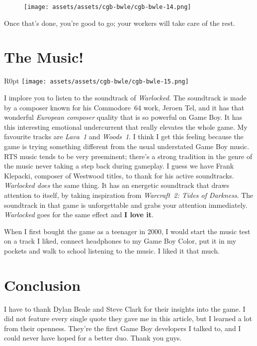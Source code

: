\documentclass{book}
\begin{document}
\begin{figure}[hbt]
\vskip 10pt
\centering \texttt{[image: assets/assets/cgb-bwle/cgb-bwle-14.png]}
\vskip 6pt
\end{figure}

Once that’s done, you’re good to go; your workers will take care of the rest.

\FloatBarrier\needspace{10mm}\section*{The Music!}\nopagebreak[4]

\begin{wrapfigure}{R}{0pt} \texttt{[image: assets/assets/cgb-bwle/cgb-bwle-15.png]}\end{wrapfigure}
I implore you to listen to the soundtrack of \emph{Warlocked}. The soundtrack is made by a composer known for his Commodore 64 work, Jeroen Tel, and it has that wonderful \emph{European composer} quality that is so powerful on Game Boy. It has this interesting emotional undercurrent that really elevates the whole game. My favourite tracks are \emph{Lava 1} and \emph{Woods 1}. I think I get this feeling because the game is trying something different from the usual understated Game Boy music. RTS music tends to be very preeminent; there’s a strong tradition in the genre of the music never taking a step back during gameplay. I guess we have Frank Klepacki, composer of Westwood titles, to thank for his active soundtracks. \emph{Warlocked does} the same thing. It has an energetic soundtrack that draws attention to itself, by taking inspiration from \emph{Warcraft 2: Tides of Darkness}. The soundtrack in that game is unforgettable and grabs your attention immediately. \emph{Warlocked} goes for the same effect and \textbf{I love it}.

When I first bought the game as a teenager in 2000, I would start the music test on a track I liked, connect headphones to my Game Boy Color, put it in my pockets and walk to school listening to the music. I liked it that much.

\FloatBarrier\needspace{10mm}\section*{Conclusion}\nopagebreak[4]

I have to thank Dylan Beale and Steve Clark for their insights into the game. I did not feature every single quote they gave me in this article, but I learned a lot from their openness. They’re the first Game Boy developers I talked to, and I could never have hoped for a better duo. Thank you guys.
\end{document}
